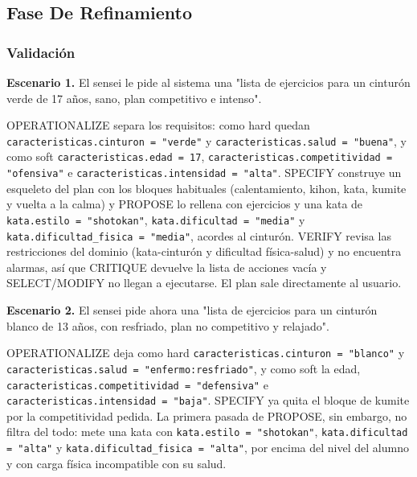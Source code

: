 \documentclass[12pt,a4paper,twoside,spanish]{article}      %
\begin{document}
\subsection{Fase De Refinamiento}


\subsubsection{Validación}

\textbf{Escenario 1.} El sensei le pide al sistema una "lista de ejercicios
para un cinturón verde de 17 años, sano, plan competitivo e intenso".

OPERATIONALIZE separa los requisitos: como hard quedan
\texttt{caracteristicas.cinturon = "verde"} y
\texttt{caracteristicas.salud = "buena"}, y como soft
\texttt{caracteristicas.edad = 17},
\texttt{caracteristicas.competitividad = "ofensiva"} e
\texttt{caracteristicas.intensidad = "alta"}. SPECIFY construye un
esqueleto del plan con los bloques habituales (calentamiento, kihon, kata,
kumite y vuelta a la calma) y PROPOSE lo rellena con ejercicios y una kata
de \texttt{kata.estilo = "shotokan"}, \texttt{kata.dificultad = "media"} y
\texttt{kata.dificultad\_fisica = "media"}, acordes al cinturón. VERIFY
revisa las restricciones del dominio (kata-cinturón y dificultad
física-salud) y no encuentra alarmas, así que CRITIQUE devuelve la lista
de acciones vacía y SELECT/MODIFY no llegan a ejecutarse. El plan sale
directamente al usuario.

\textbf{Escenario 2.} El sensei pide ahora una "lista de ejercicios para
un cinturón blanco de 13 años, con resfriado, plan no competitivo y
relajado".

OPERATIONALIZE deja como hard \texttt{caracteristicas.cinturon = "blanco"}
y \texttt{caracteristicas.salud = "enfermo:resfriado"}, y como soft la
edad, \texttt{caracteristicas.competitividad = "defensiva"} e
\texttt{caracteristicas.intensidad = "baja"}. SPECIFY ya quita el bloque
de kumite por la competitividad pedida. La primera pasada de PROPOSE, sin
embargo, no filtra del todo: mete una kata con \texttt{kata.estilo =
"shotokan"}, \texttt{kata.dificultad = "alta"} y
\texttt{kata.dificultad\_fisica = "alta"}, por encima del nivel del
alumno y con carga física incompatible con su salud.
\end{document}
